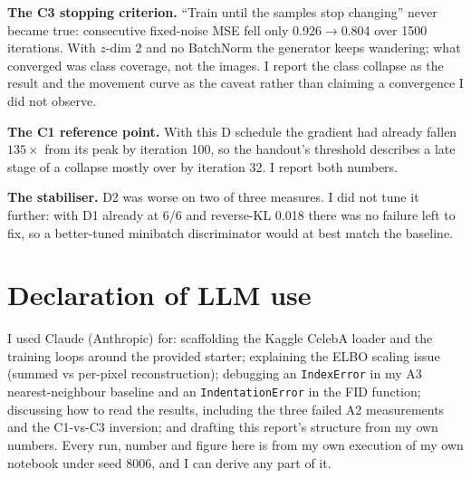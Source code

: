\documentclass[10pt,twocolumn]{article}
\begin{document}
\textbf{The C3 stopping criterion.} ``Train until the samples stop changing'' never
became true: consecutive fixed-noise MSE fell only 0.926$\rightarrow$0.804 over 1500
iterations. With $z$-dim 2 and no BatchNorm the generator keeps wandering; what converged
was class coverage, not the images. I report the class collapse as the result and the
movement curve as the caveat rather than claiming a convergence I did not observe.

\textbf{The C1 reference point.} With this D schedule the gradient had already fallen
$135\times$ from its peak by iteration 100, so the handout's threshold describes a late
stage of a collapse mostly over by iteration 32. I report both numbers.

\textbf{The stabiliser.} D2 was worse on two of three measures. I did not tune it
further: with D1 already at 6/6 and reverse-KL 0.018 there was no failure left to fix,
so a better-tuned minibatch discriminator would at best match the baseline.

\section{Declaration of LLM use}

I used Claude (Anthropic) for: scaffolding the Kaggle CelebA loader and the training
loops around the provided starter; explaining the ELBO scaling issue (summed vs
per-pixel reconstruction); debugging an \texttt{IndexError} in my A3 nearest-neighbour
baseline and an \texttt{IndentationError} in the FID function; discussing how to read
the results, including the three failed A2 measurements and the C1-vs-C3 inversion; and
drafting this report's structure from my own numbers. Every run, number and figure here is from my own
execution of my own notebook under seed 8006, and I can derive any part of it.
\end{document}

